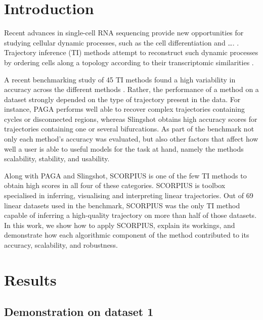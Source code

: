 \section{Introduction}
Recent advances in single-cell RNA sequencing provide new opportunities for studying cellular dynamic processes, such as the cell differentiation and \ldots. \cite{tanay_scalingsinglecellgenomics_2017,etzrodt_quantitativesinglecellapproaches_2014}.
Trajectory inference (TI) methods attempt to reconstruct such dynamic processes by ordering cells along a topology according to their transcriptomic similarities \cite{tanay_scalingsinglecellgenomics_2017,cannoodt_computationalmethodstrajectory_2016}. 

A recent benchmarking study of 45 TI methods found a high variability in accuracy across the different methods \cite{saelens_comparisonsinglecelltrajectory_2019}. Rather, the performance of a method on a dataset strongly depended on the type of trajectory present in the data. For instance, PAGA \cite{wolf_pagagraphabstraction_2019} performs well able to recover complex trajectories containing cycles or disconnected regions, whereas Slingshot \cite{street_slingshotcelllineage_2018} obtains high accuracy scores for trajectories containing one or several bifurcations. As part of the benchmark not only each method's accuracy was evaluated, but also other factors that affect how well a user is able to useful models for the task at hand, namely the methods scalability, stability, and usability.

Along with PAGA and Slingshot, SCORPIUS is one of the few TI methods to obtain high scores in all four of these categories. SCORPIUS is toolbox specialised in inferring, visualising and interpreting linear trajectories. Out of 69 linear datasets used in the benchmark, SCORPIUS was the only TI method capable of inferring a high-quality trajectory on more than half of those datasets. In this work, we show how to apply SCORPIUS, explain its workings, and demonstrate how each algorithmic component of the method contributed to its accuracy, scalability, and robustness.


\section{Results}

\subsection{Demonstration on dataset 1}

